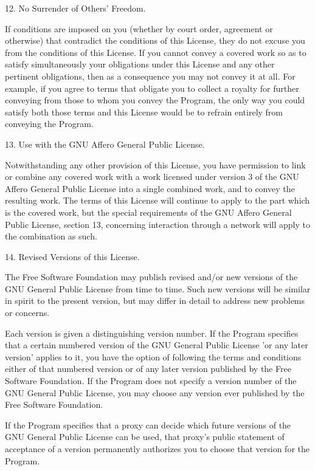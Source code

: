 \documentclass{article}
\begin{document}
  12. No Surrender of Others' Freedom.

  If conditions are imposed on you (whether by court order, agreement or
otherwise) that contradict the conditions of this License, they do not
excuse you from the conditions of this License.  If you cannot convey a
covered work so as to satisfy simultaneously your obligations under this
License and any other pertinent obligations, then as a consequence you may
not convey it at all.  For example, if you agree to terms that obligate you
to collect a royalty for further conveying from those to whom you convey
the Program, the only way you could satisfy both those terms and this
License would be to refrain entirely from conveying the Program.

  13. Use with the GNU Affero General Public License.

  Notwithstanding any other provision of this License, you have
permission to link or combine any covered work with a work licensed
under version 3 of the GNU Affero General Public License into a single
combined work, and to convey the resulting work.  The terms of this
License will continue to apply to the part which is the covered work,
but the special requirements of the GNU Affero General Public License,
section 13, concerning interaction through a network will apply to the
combination as such.

  14. Revised Versions of this License.

  The Free Software Foundation may publish revised and/or new versions of
the GNU General Public License from time to time.  Such new versions will
be similar in spirit to the present version, but may differ in detail to
address new problems or concerns.

  Each version is given a distinguishing version number.  If the
Program specifies that a certain numbered version of the GNU General
Public License 'or any later version' applies to it, you have the
option of following the terms and conditions either of that numbered
version or of any later version published by the Free Software
Foundation.  If the Program does not specify a version number of the
GNU General Public License, you may choose any version ever published
by the Free Software Foundation.

  If the Program specifies that a proxy can decide which future
versions of the GNU General Public License can be used, that proxy's
public statement of acceptance of a version permanently authorizes you
to choose that version for the Program.
\end{document}
